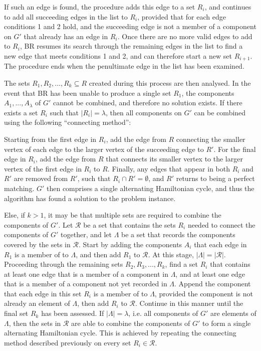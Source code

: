 \documentclass[oribibl]{llncs}
\begin{document}
If such an edge is found, the procedure adds this edge to a set $R_i$, and continues to add all succeeding edges in the list to $R_i$, provided that for each edge conditions 1 and 2 hold, and the succeeding edge is not a member of a component on $G'$ that already has an edge in $R_i$. Once there are no more valid edges to add to $R_i$, BR resumes its search through the remaining edges in the list to find a new edge that meets conditions 1 and 2, and can therefore start a new set $R_{i+1}$. The procedure ends when the penultimate edge in the list has been examined.

The sets $R_1, R_2, ..., R_k \subseteq R$ created during this process are then analysed. In the event that BR has been unable to produce a single set $R_1$, the components $A_1,..., A_{\lambda}$ of $G'$ cannot be combined, and therefore no solution exists. If there exists a set $R_i$ such that $|R_i| = \lambda$, then all components on $G'$ can be combined using the following ``connecting method'':

Starting from the first edge in $R_i$, add the edge from $R$ connecting the smaller vertex of each edge to the larger vertex of the succeeding edge to $R'$. For the final edge in $R_i$, add the edge from $R$ that connects its smaller vertex to the larger vertex of the first edge in $R_i$ to $R$. Finally, any edges that appear in both $R_i$ and $R'$ are removed from $R'$, such that $R_i \cap R' = \emptyset$, and $R'$ returns to being a perfect matching. $G'$ then comprises a single alternating Hamiltonian cycle, and thus the algorithm has found a solution to the problem instance.


Else, if $k > 1$, it may be that multiple sets are required to combine the components of $G'$. Let $\mathcal{R}$ be a set that contains the sets $R_i$ needed to connect the components of $G'$ together, and let $\Lambda$ be a set that records the components covered by the sets in $\mathcal{R}$. Start by adding the components $A_i$ that each edge in $R_1$ is a member of to $\Lambda$, and then add $R_1$ to $\mathcal{R}$. At this stage, $|\Lambda| = |\mathcal{R}|$. Proceeding through the remaining sets $R_2, R_3, ..., R_k$, find a set $R_i$ that contains at least one edge that is a member of a component in $\Lambda$, and at least one edge that is a member of a component not yet recorded in $\Lambda$. Append the component that each edge in this set $R_i$ is a member of to $\Lambda$, provided the component is not already an element of $\Lambda$, then add $R_i$ to $\mathcal{R}$. Continue in this manner until the final set $R_k$ has been assessed. If $|\Lambda| = \lambda$, i.e. all components of $G'$ are elements of $\Lambda$, then the sets in $\mathcal{R}$ are able to combine the components of $G'$ to form a single alternating Hamiltonian cycle. This is achieved by repeating the connecting method described previously on every set $R_i \in \mathcal{R}$.
\end{document}
